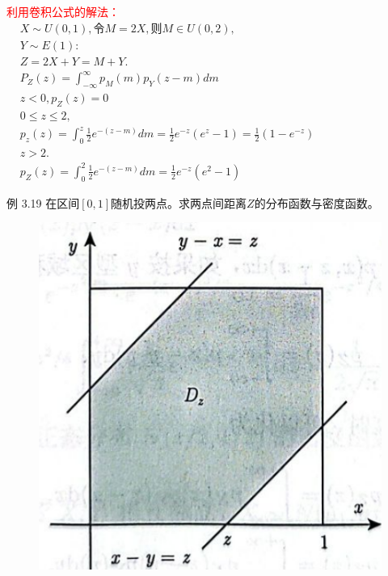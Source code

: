 \documentclass{beamer}
\newcommand{\new}[1]{\textcolor{red}{#1}}
\begin{document}
	\begin{frame}
		\new{利用卷积公式的解法：}
		$\begin{aligned} & X \sim U(0,1), \text {令} M=2 X, \text {则} M \in U(0,2), \\ & Y \sim E(1): \\ & Z=2 X+Y=M+Y . \\ & P_Z(z)=\int_{-\infty}^{\infty} p_M(m) p_Y(z-m) d m \\ & z<0, p_Z(z)=0 \\ & 0 \leqslant z \leqslant 2, \\ & p_z(z)=\int_0^z \frac{1}{2} e^{-(z-m)} d m=\frac{1}{2} e^{-z}\left(e^z-1\right)=\frac{1}{2}\left(1-e^{-z}\right) \\ & z>2 . \\ & p_Z(z)=\int_0^2 \frac{1}{2} e^{-(z-m)} d m=\frac{1}{2} e^{-z}\left(e^2-1\right)\end{aligned}$
	\end{frame}
	\begin{frame}
		例 3.19 在区间$[0, 1]$随机投两点。求两点间距离$Z$的分布函数与密度函数。
		\begin{figure}
			\centering
			\includegraphics[scale = 0.37]{figures/figure3-55.png}
		\end{figure}
	\end{frame}
	
\end{document}
